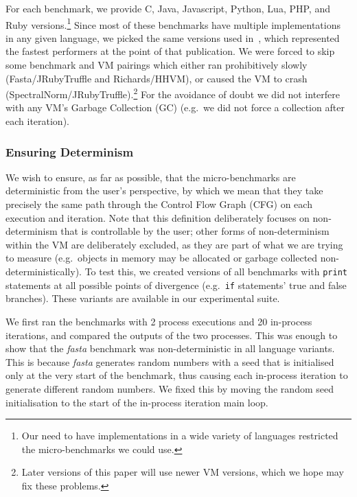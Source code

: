 \documentclass[a4paper,UKenglish]{lipics}
\newcommand{\fasta}{\emph{fasta}\xspace}
\begin{document}
For each benchmark, we provide C, Java, Javascript, Python, Lua, PHP,
and Ruby versions.\footnote{Our need to have implementations in a wide variety
of languages restricted the micro-benchmarks we could use.} Since most of these
benchmarks have multiple implementations in any given language, we picked
the same versions used in~\cite{bolz14impact}, which represented the fastest
performers at the point of that publication. We were forced to skip some
benchmark and VM pairings which either ran prohibitively slowly
(Fasta/JRubyTruffle and Richards/HHVM), or caused the VM to crash
(SpectralNorm/JRubyTruffle).\footnote{Later versions of this paper
will use newer VM versions, which we hope may fix these problems.}
For the avoidance of doubt we
did not interfere with any VM's Garbage Collection (GC) (e.g.~we did not
force a collection after each iteration).


\subsubsection{Ensuring Determinism}

We wish to ensure, as far as possible, that the micro-benchmarks are
deterministic from the user's perspective, by which we mean that they
take precisely the same path through the Control Flow Graph (CFG) on each
execution and iteration. Note that this definition deliberately focuses
on non-determinism that is controllable by the user; other forms of
non-determinism within the VM are deliberately excluded, as they are
part of what we are trying to measure (e.g.~objects in memory may be allocated
or garbage collected non-deterministically). To test this, we created
versions of all benchmarks with \texttt{print} statements at all possible points of
divergence (e.g.~\texttt{if} statements' true and false branches).
These variants are available in our experimental suite.

We first ran the benchmarks with 2 process executions and 20 in-process iterations,
and compared the outputs of the two processes. This was enough to show that the
\fasta benchmark was non-deterministic
in all language variants. This is because \fasta generates random numbers with
a seed that is initialised only at the very start of the benchmark, thus
causing each in-process iteration to generate different random numbers. We
fixed this by moving the random seed initialisation to the start
of the in-process iteration main loop.
\end{document}
